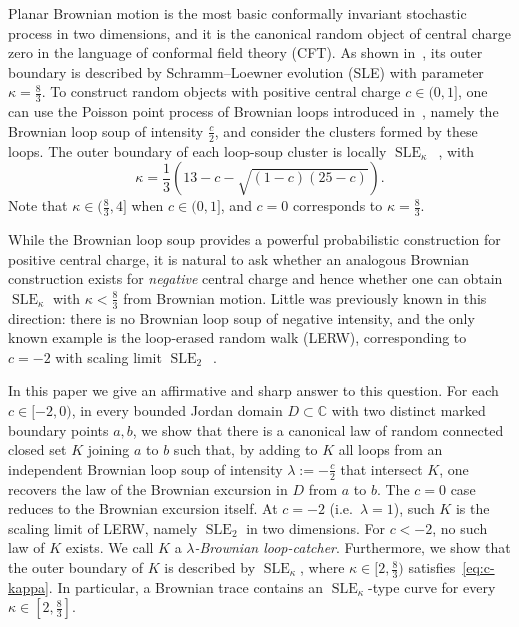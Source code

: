 \documentclass[11pt]{article}
\numberwithin{equation}{section}
\newcommand{\C}{\mathbb{C}}
\newcommand{\1}{\mathbf{1}}
\DeclareMathOperator{\SLE}{SLE}
\begin{document}
Planar Brownian motion is the most basic conformally invariant stochastic process in two dimensions, and it is the canonical random object of central charge zero in the language of conformal field theory (CFT). As shown in~\cite{lsw-restriction}, its outer boundary is described by Schramm--Loewner evolution (SLE) with parameter $\kappa=\frac{8}{3}$. To construct random objects with positive central charge $c\in(0,1]$, one can use the Poisson point process of Brownian loops introduced in~\cite{LW04}, namely the Brownian loop soup of intensity $\frac{c}{2}$, and consider the clusters formed by these loops.  The outer boundary of each loop-soup cluster is locally $\SLE_\kappa$~\cite{shef-werner-cle}, with
\begin{equation}\label{eq:c-kappa}
        \kappa = \frac{1}{3}\left(13 - c - \sqrt{(1-c)(25-c)}\right).
\end{equation}
Note that $\kappa\in(\frac{8}{3},4]$ when $c\in(0,1]$, and $c=0$ corresponds to $\kappa=\frac{8}{3}$.

While the Brownian loop soup provides a powerful probabilistic construction for positive central charge, it is natural to ask whether an analogous Brownian construction exists for \emph{negative} central charge and hence whether one can obtain $\SLE_\kappa$ with $\kappa<\frac{8}{3}$ from Brownian motion. Little was previously known in this direction: there is no Brownian loop soup of negative intensity, and the only known example is the loop-erased random walk (LERW), corresponding to $c=-2$ with scaling limit $\SLE_2$~\cite{schramm0,LawlerSchrammWerner2004}.

In this paper we give an affirmative and sharp answer to this question. For each
$c\in[-2,0)$, in
every bounded Jordan domain \(D\subset\C\) with two
distinct marked boundary points \(a,b\), we show that there is a canonical law of random connected closed set $K$ joining \(a\) to \(b\) such that, by adding
to $K$ all loops from an independent Brownian loop soup of intensity
$\lambda:=-\frac{c}{2}$ that intersect $K$, one recovers the law of the Brownian excursion in $D$ from $a$ to $b$. The $c=0$ case reduces to the Brownian excursion itself.  At $c=-2$ (i.e.~$\lambda=1$), such $K$ is the scaling limit of LERW, namely 
$\SLE_2$ in two dimensions. For $c<-2$, no such law of $K$ exists.  We call $K$ a
\emph{$\lambda$-Brownian loop-catcher}.  Furthermore, we show that the outer
boundary of $K$ is described by $\SLE_\kappa$, where
$\kappa\in[2,\frac{8}{3})$ satisfies~\eqref{eq:c-kappa}.  In particular, a
Brownian trace contains an $\SLE_\kappa$-type curve for every
$\kappa\in[2,\frac{8}{3}]$.
\end{document}
